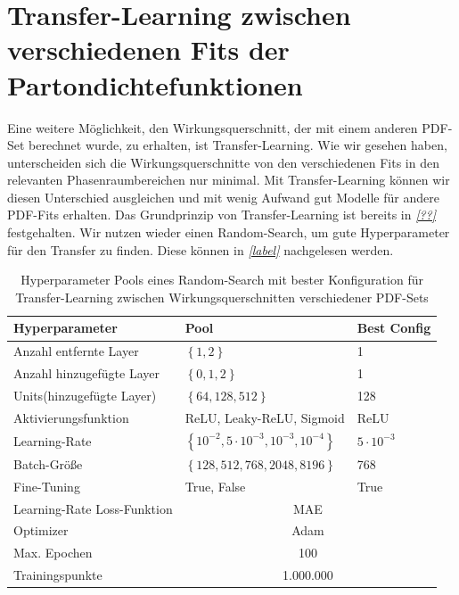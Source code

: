 \section{Transfer-Learning zwischen verschiedenen Fits der Partondichtefunktionen}
Eine weitere Möglichkeit, den Wirkungsquerschnitt, der mit einem anderen PDF-Set berechnet wurde, zu erhalten, ist Transfer-Learning. Wie wir gesehen haben, unterscheiden sich die Wirkungsquerschnitte von den verschiedenen Fits in den relevanten Phasenraumbereichen nur minimal. Mit Transfer-Learning können wir diesen Unterschied ausgleichen und mit wenig Aufwand gut Modelle für andere PDF-Fits erhalten. Das Grundprinzip von Transfer-Learning ist bereits in \textit{\autoref{??}} festgehalten. Wir nutzen wieder einen Random-Search, um gute Hyperparameter für den Transfer zu finden. Diese können in \textit{\autoref{label}} nachgelesen werden.\\
\begin{table}
	\centering
	\begin{tabular}{|l|l|l|}
		\hline
		Hyperparameter & Pool & Best Config \\
		\hline
		Anzahl entfernte Layer & $\left\lbrace  1, 2 \right\rbrace $ & 1 \\
		Anzahl hinzugefügte Layer & $\left\lbrace  0, 1, 2 \right\rbrace $ & 1 \\
		Units(hinzugefügte Layer) &$\left\lbrace 64, 128, 512\right\rbrace$ & 128\\
		Aktivierungsfunktion & ReLU, Leaky-ReLU, Sigmoid & ReLU \\
		Learning-Rate & $\left\lbrace 10^{-2}, 5 \cdot 10^{-3}, 10^{-3}, 10^{-4} \right\rbrace $ & $5 \cdot 10^{-3}$\\
		Batch-Größe & $\left\lbrace 128, 512, 768, 2048, 8196 \right\rbrace $ & 768\\
		Fine-Tuning & True, False & True \\
		\hline
		Learning-Rate
		Loss-Funktion & \multicolumn{2}{c|}{MAE} \\
		Optimizer & \multicolumn{2}{c|}{Adam} \\
		Max. Epochen & \multicolumn{2}{c|}{100}\\
		Trainingspunkte & \multicolumn{2}{c|}{1.000.000} \\
		\hline
	\end{tabular}
	\caption{Hyperparameter Pools eines Random-Search mit bester Konfiguration für Transfer-Learning zwischen Wirkungsquerschnitten verschiedener PDF-Sets}
\end{table}
